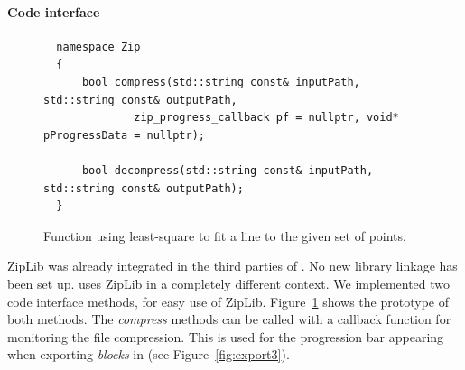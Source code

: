 \paragraph{Code interface}
\begin{figure}
  \centering
  \begin{lstlisting}
  namespace Zip
  {
      bool compress(std::string const& inputPath, std::string const& outputPath,
              zip_progress_callback pf = nullptr, void* pProgressData = nullptr);

      bool decompress(std::string const& inputPath, std::string const& outputPath);
  }
  \end{lstlisting}
  \caption{Function using least-square to fit a line to the given set of points.}
  \label{fig:code-interface}
\end{figure}
ZipLib was already integrated in the third parties of \CC. No new library linkage has been set up. \CC uses ZipLib in a completely different context. We implemented two code interface methods, for easy use of ZipLib. Figure~\ref{fig:code-interface} shows the prototype of both methods. The  \emph{compress} methods can be called with a callback function for monitoring the file compression. This is used for the progression bar appearing when exporting  \emph{blocks} in \CC (see Figure~\ref{fig:export3}).


